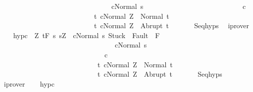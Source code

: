 \begin{isabellebody}
\ \ \ \ \ \ \ \ \ \ \ \ \ \ \ \ \ \ \ \ \ \ \ \ \ \ \ \ \ \ \ \ {\isasymGamma}{\isasymturnstile}c{}{\isasymdown}Normal\ s{\isacharbraceright}\isanewline
\ \ \ \ \ \ \ \ \ \ \ \ \ \ \ \ \ \ \ \ \ \ \ \ \ \ \ \ c{}\ \isanewline
\ \ \ \ \ \ \ \ \ \ \ \ \ \ \ \ \ \ \ \ \ \ \ \ \ \ \ {\isacharbraceleft}t{\isachardot}\ {\isasymGamma}{\isasymturnstile}{\isasymlangle}c{}{\isacharcomma}Normal\ Z{\isasymrangle}\ {\isasymRightarrow}\ Normal\ t{\isacharbraceright}{\isacharcomma}\isanewline
\ \ \ \ \ \ \ \ \ \ \ \ \ \ \ \ \ \ \ \ \ \ \ \ \ \ \ {\isacharbraceleft}t{\isachardot}\ {\isasymGamma}{\isasymturnstile}{\isasymlangle}c{}{\isacharcomma}Normal\ Z{\isasymrangle}\ {\isasymRightarrow}\ Abrupt\ t{\isacharbraceright}{\isachardoublequoteclose}\ \isanewline
\ \ \ \ \isamarkupfalse%
\ Seq{\isachardot}hyps\ \isamarkupfalse%
\ iprover\isanewline
\ \ \isamarkupfalse%
\ hyp{\isacharunderscore}c{}{\isacharcolon}\ {\isachardoublequoteopen}{\isasymforall}\ Z{\isachardot}\ {\isasymGamma}{\isacharcomma}{\isasymTheta}{\isasymturnstile}\isactrlsub t\isactrlbsub {\isacharslash}F\isactrlesub \ {\isacharbraceleft}s{\isachardot}\ s{\isacharequal}Z\ {\isasymand}\ {\isasymGamma}{\isasymturnstile}{\isasymlangle}c{}{\isacharcomma}Normal\ s{\isasymrangle}\ {\isasymRightarrow}{\isasymnotin}{\isacharparenleft}{\isacharbraceleft}Stuck{\isacharbraceright}\ {\isasymunion}\ Fault\ {\isacharbackquote}\ {\isacharparenleft}{\isacharminus}F{\isacharparenright}{\isacharparenright}\ {\isasymand}\ \isanewline
\ \ \ \ \ \ \ \ \ \ \ \ \ \ \ \ \ \ \ \ \ \ \ \ \ \ \ \ \ \ \ \ \ {\isasymGamma}{\isasymturnstile}c{}{\isasymdown}Normal\ s{\isacharbraceright}\isanewline
\ \ \ \ \ \ \ \ \ \ \ \ \ \ \ \ \ \ \ \ \ \ \ \ \ \ \ \ \ \ c{}\ \isanewline
\ \ \ \ \ \ \ \ \ \ \ \ \ \ \ \ \ \ \ \ \ \ \ \ \ \ \ \ {\isacharbraceleft}t{\isachardot}\ {\isasymGamma}{\isasymturnstile}{\isasymlangle}c{}{\isacharcomma}Normal\ Z{\isasymrangle}\ {\isasymRightarrow}\ Normal\ t{\isacharbraceright}{\isacharcomma}\isanewline
\ \ \ \ \ \ \ \ \ \ \ \ \ \ \ \ \ \ \ \ \ \ \ \ \ \ \ \ {\isacharbraceleft}t{\isachardot}\ {\isasymGamma}{\isasymturnstile}{\isasymlangle}c{}{\isacharcomma}Normal\ Z{\isasymrangle}\ {\isasymRightarrow}\ Abrupt\ t{\isacharbraceright}{\isachardoublequoteclose}\ \isanewline
\ \ \ \ \isamarkupfalse%
\ Seq{\isachardot}hyps\ \isamarkupfalse%
\ iprover\isanewline
\ \ \isamarkupfalse%
\ hyp{\isacharunderscore}c{}\ \isanewline

\end{isabellebody}
